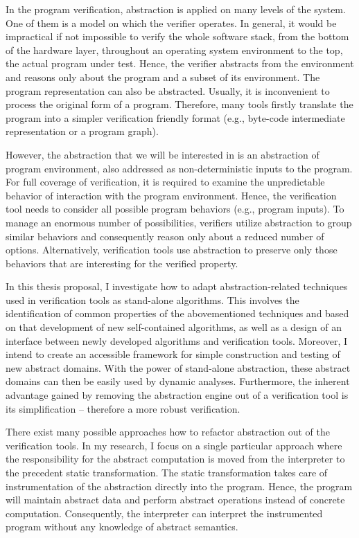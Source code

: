 In the program verification, abstraction is applied on many levels of the
system.  One of them is a model on which the verifier operates. In general, it
would be impractical if not impossible to verify the whole software stack, from
the bottom of the hardware layer, throughout an operating system environment to
the top, the actual program under test. Hence, the verifier abstracts from the
environment and reasons only about the program and a subset of its environment.
The program representation can also be abstracted.  Usually, it is inconvenient
to process the original form of a program. Therefore, many tools firstly
translate the program into a simpler verification friendly format  (e.g.,
byte-code intermediate representation or a program graph).

However, the abstraction that we will be interested in is an abstraction of
program environment, also addressed as non-deter\-mi\-ni\-stic inputs to the program.
For full coverage of verification, it is required to examine the unpredictable
behavior of interaction with the program environment. Hence, the verification
tool needs to consider all possible program behaviors (e.g., program inputs).
To manage an enormous number of possibilities, verifiers utilize abstraction to
group similar behaviors and consequently reason only about a reduced number of
options. Alternatively, verification tools use abstraction to preserve only
those behaviors that are interesting for the verified property.

In this thesis proposal, I investigate how to adapt abstraction-related
techniques used in verification tools as stand-alone algorithms. This involves
the identification of common properties of the abovementioned techniques and
based on that development of new self-con\-tained algorithms, as well as a
design of an interface between newly developed algorithms and verification
tools. Moreover, I intend to create an accessible framework for simple
construction and testing of new abstract domains. With the power of stand-alone
abstraction, these abstract domains can then be easily used by dynamic
analyses. Furthermore, the inherent advantage gained by removing the
abstraction engine out of a verification tool is its simplification --
therefore a more robust verification.

There exist many possible approaches how to refactor abstraction out of the
verification tools. In my research, I focus on a single particular approach
where the responsibility for the abstract computation is moved from the
interpreter to the precedent static transformation. The static transformation
takes care of instrumentation of the abstraction directly into the program.
Hence, the program will maintain abstract data and perform abstract operations
instead of concrete computation. Conse\-quen\-tly, the interpreter can interpret
the instrumented program without any knowledge of abstract semantics.

